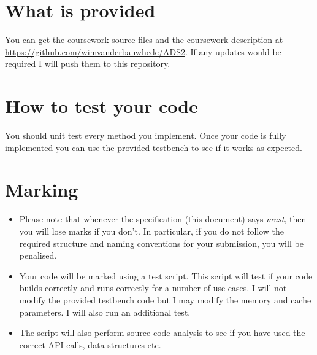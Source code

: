 \documentclass[11pt]{article}
\begin{document}
\section{What is provided}\label{what-is-provided}

You can get the coursework source files and the coursework description at \url{https://github.com/wimvanderbauwhede/ADS2}. If any updates would be required I will push them to this repository.


\section{How to test your code}\label{how-to-test-your-code}

You should unit test every method you implement. Once your code is fully implemented you can use the provided testbench to see if it works as expected.

\section{Marking}\label{marking}


\begin{itemize}
\item Please note that whenever the specification (this document) says \emph{must}, then you will lose marks if you don't. In particular, if you do not follow the required structure and naming conventions for your submission, you will be penalised.  

\item Your code will be marked using a test script. This script will test if your code builds correctly and runs correctly for a number of use cases. I will not modify the provided testbench code but I may modify the memory and cache parameters. I will also run an additional test. 
\item The script will also perform source code analysis to see if you have used the correct API calls, data structures etc. 
\end{itemize}
\end{document}
